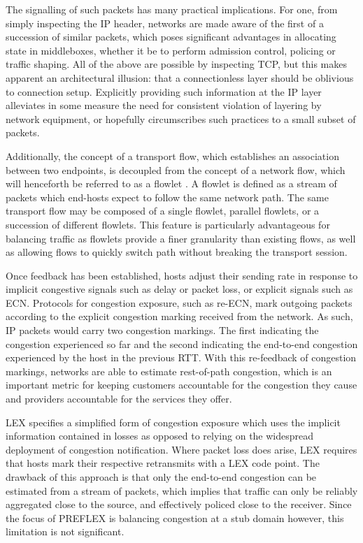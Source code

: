 The signalling of such packets has many practical implications. 
For one, from simply inspecting the \ac{IP} header, networks are made aware of the first of a succession of similar packets, which poses significant advantages in allocating state in middleboxes, whether it be to perform admission control, policing or traffic shaping. 
All of the above are possible by inspecting \ac{TCP}, but this makes apparent an architectural illusion: that a connectionless layer should be oblivious to connection setup. 
Explicitly providing such information at the \ac{IP} layer alleviates in some measure the need for consistent violation of layering by network equipment, or hopefully circumscribes such practices to a small subset of packets.

Additionally, the concept of a transport flow, which establishes an association between two endpoints, is decoupled from the concept of a network flow, which will henceforth be referred to as a flowlet \cite{Sinha:2004p124}. 
A flowlet is defined as a stream of packets which end-hosts expect to follow the same network path. 
The same transport flow may be composed of a single flowlet, parallel flowlets, or a succession of different flowlets. 
This feature is particularly advantageous for balancing traffic as flowlets provide a finer granularity than existing flows, as well as allowing flows to quickly switch path without breaking the transport session.

Once feedback has been established, hosts adjust their sending rate in response to implicit congestive signals such as delay or packet loss, or explicit signals such as \ac{ECN}. Protocols for congestion exposure, such as re-\ac{ECN}, mark outgoing packets according to the explicit congestion marking received from the network. As such, \ac{IP} packets would carry two congestion markings. The first indicating the congestion experienced so far and the second indicating the end-to-end congestion experienced by the host in the previous RTT. With this re-feedback of congestion markings, networks are able to estimate rest-of-path congestion, which is an important metric for keeping customers accountable for the congestion they cause and providers accountable for the services they offer.

\ac{LEX} specifies a simplified form of congestion exposure which uses the implicit information contained in losses as opposed to relying on the widespread deployment of congestion notification. Where packet loss does arise, \ac{LEX} requires that hosts mark their respective retransmits with a \ac{LEX} code point. The drawback of this approach is that only the end-to-end congestion can be estimated from a stream of packets, which implies that traffic can only be reliably aggregated close to the source, and effectively policed close to the receiver. Since the focus of \ac{PREFLEX} is balancing congestion at a stub domain however, this limitation is not significant.

